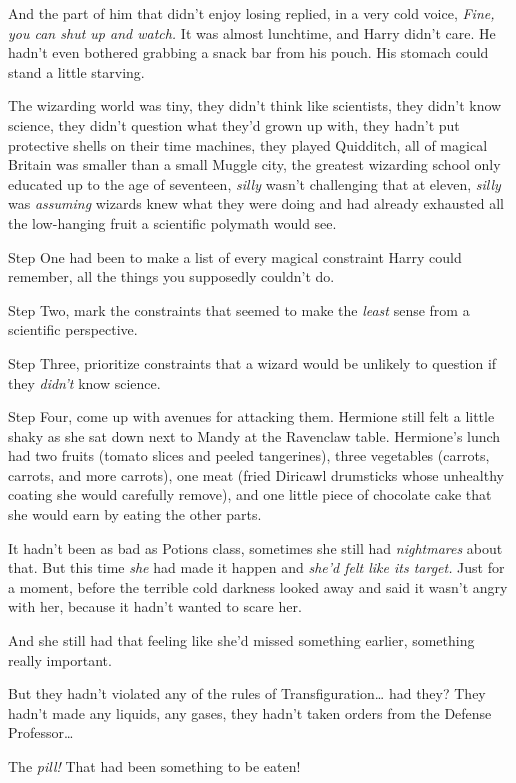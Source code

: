 And the part of him that didn't enjoy losing replied, in a very cold voice,
\emph{Fine, you can shut up and watch.}
\later
It was almost lunchtime, and Harry didn't care. He hadn't even bothered
grabbing a snack bar from his pouch. His stomach could stand a little starving.

The wizarding world was tiny, they didn't think like scientists, they didn't
know science, they didn't question what they'd grown up with, they hadn't put
protective shells on their time machines, they played Quidditch, all of magical
Britain was smaller than a small Muggle city, the greatest wizarding school
only educated up to the age of seventeen, \emph{silly} wasn't challenging that
at eleven, \emph{silly} was \emph{assuming} wizards knew what they were doing
and had already exhausted all the low-hanging fruit a scientific polymath would
see.

Step One had been to make a list of every magical constraint Harry could
remember, all the things you supposedly couldn't do.

Step Two, mark the constraints that seemed to make the \emph{least} sense from
a scientific perspective.

Step Three, prioritize constraints that a wizard would be unlikely to question
if they \emph{didn't} know science.

Step Four, come up with avenues for attacking them.
\later
Hermione still felt a little shaky as she sat down next to Mandy at the
Ravenclaw table. Hermione's lunch had two fruits (tomato slices and peeled
tangerines), three vegetables (carrots, carrots, and more carrots), one meat
(fried Diricawl drumsticks whose unhealthy coating she would carefully remove),
and one little piece of chocolate cake that she would earn by eating the other
parts.

It hadn't been as bad as Potions class, sometimes she still had
\emph{nightmares} about that. But this time \emph{she} had made it happen and
\emph{she'd felt like its target.} Just for a moment, before the terrible cold
darkness looked away and said it wasn't angry with her, because it hadn't
wanted to scare her.

And she still had that feeling like she'd missed something earlier, something
really important.

But they hadn't violated any of the rules of Transfiguration{\ldots} had they?
They hadn't made any liquids, any gases, they hadn't taken orders from the
Defense Professor{\ldots}

The \emph{pill!} That had been something to be eaten!

